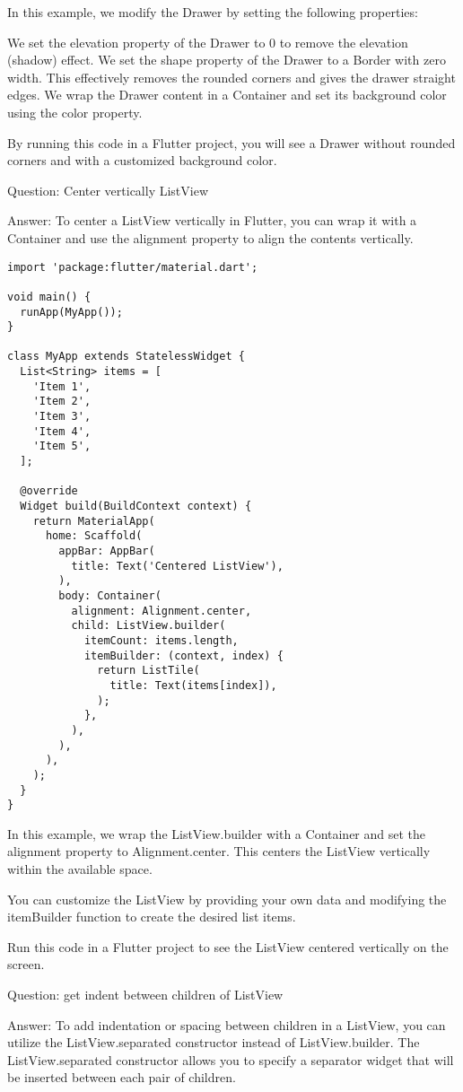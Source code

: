 In this example, we modify the Drawer by setting the following properties:

We set the elevation property of the Drawer to 0 to remove the elevation (shadow) effect.
We set the shape property of the Drawer to a Border with zero width. This effectively removes the rounded 
corners and gives the drawer straight edges.
We wrap the Drawer content in a Container and set its background color using the color property.

By running this code in a Flutter project, you will see a Drawer without rounded corners and with a customized 
background color.


Question: Center vertically ListView

Answer: To center a ListView vertically in Flutter, you can wrap it with a Container and use the alignment property 
to align the contents vertically.

\begin{lstlisting}
import 'package:flutter/material.dart';

void main() {
  runApp(MyApp());
}

class MyApp extends StatelessWidget {
  List<String> items = [
    'Item 1',
    'Item 2',
    'Item 3',
    'Item 4',
    'Item 5',
  ];

  @override
  Widget build(BuildContext context) {
    return MaterialApp(
      home: Scaffold(
        appBar: AppBar(
          title: Text('Centered ListView'),
        ),
        body: Container(
          alignment: Alignment.center,
          child: ListView.builder(
            itemCount: items.length,
            itemBuilder: (context, index) {
              return ListTile(
                title: Text(items[index]),
              );
            },
          ),
        ),
      ),
    );
  }
}
\end{lstlisting}

In this example, we wrap the ListView.builder with a Container and set the alignment property to Alignment.center. 
This centers the ListView vertically within the available space.

You can customize the ListView by providing your own data and modifying the itemBuilder function to create the 
desired list items.

Run this code in a Flutter project to see the ListView centered vertically on the screen.


Question: get indent between children of ListView

Answer: To add indentation or spacing between children in a ListView, you can utilize the ListView.separated 
constructor instead of ListView.builder. The ListView.separated constructor allows you to specify a separator 
widget that will be inserted between each pair of children.

